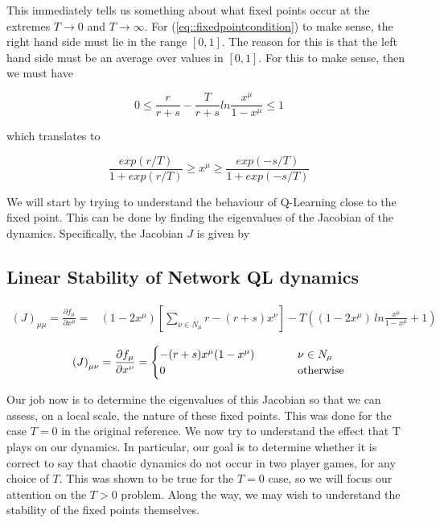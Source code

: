 \documentclass[preprint,12pt]{article}
\theoremstyle{definition}
\theoremstyle{theorem}
\theoremstyle{remark}
\theoremstyle{example}
\newcommand{\xmu}{x^\mu}
\newcommand{\xnu}{x^\nu}
\begin{document}
	This immediately tells us something about what fixed points occur at the extremes $T \rightarrow 0$ and $T \rightarrow \infty$. For (\ref{eq::fixedpointcondition}) to make sense, the right hand side must lie in the range $[0, 1]$. The reason for this is that the left hand side must be an average over values in $[0, 1]$. For this to make sense, then we must have
	
	\begin{equation}
		0 \leq \frac{r}{r + s} - \frac{T}{r + s} ln \frac{x^\mu}{1 - x^\mu} \leq 1
	\end{equation}

	which translates to
	
	\begin{equation}
	\frac{exp(r/T)}{1 + exp(r/T)} \geq \xmu \geq \frac{exp(-s/T)}{1 + exp(-s/T)}
	\end{equation}	
	
	We will start by trying to understand the behaviour of Q-Learning close to the fixed point. This can be done by finding the eigenvalues of the Jacobian of the dynamics. Specifically, the Jacobian $J$ is given by 
	
	\subsection*{Linear Stability of Network QL dynamics}
	
	\begin{align}
		\left( J \right)_{\mu \mu} = \frac{\partial f_\mu}{\partial x^\mu} =  &(1 - 2 \xmu)\left[ \sum_{\nu \in N_\mu} r - (r + s) \xnu \right] -  T \left( (1 - 2\xmu) \, ln \frac{\xmu}{1 - \xmu} + 1 \right)
	\end{align}
	
	\begin{align}
		\left( J \right)_{\mu \nu} = \frac{\partial f_\mu}{\partial x^\nu}  = \begin{cases}
			-(r + s)\xmu(1 - \xmu) \hspace*{1cm} & \nu \in N_\mu \\ 
			0 & \text{otherwise}
		\end{cases}
	\end{align}

	Our job now is to determine the eigenvalues of this Jacobian so that we can assess, on a local scale, the nature of these fixed points. This was done for the case $T = 0$ in the original reference. We now try to understand the effect that T plays on our dynamics. In particular, our goal is to determine whether it is correct to say that chaotic dynamics do not occur in two player games, for any choice of $T$. This was shown to be true for the $T = 0$ case, so we will focus our attention on the $T > 0$ problem. Along the way, we may wish to understand the stability of the fixed points themselves.
	
\end{document}
